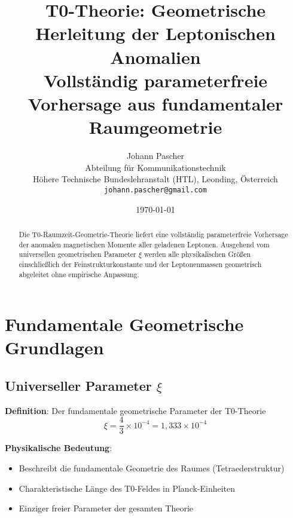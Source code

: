\documentclass[12pt,a4paper]{article}
\newcommand{\xipar}{\xi}
\begin{document}
	
	\title{T0-Theorie: Geometrische Herleitung der Leptonischen Anomalien \\
		\large Vollständig parameterfreie Vorhersage aus fundamentaler Raumgeometrie}
	\author{Johann Pascher\\
		Abteilung für Kommunikationstechnik\\
		Höhere Technische Bundeslehranstalt (HTL), Leonding, Österreich\\
		\texttt{johann.pascher@gmail.com}}
	\date{\today}
	
	\maketitle
	
	\begin{abstract}
		Die T0-Raumzeit-Geometrie-Theorie liefert eine vollständig parameterfreie Vorhersage der anomalen magnetischen Momente aller geladenen Leptonen. Ausgehend vom universellen geometrischen Parameter $\xipar$ werden alle physikalischen Größen einschließlich der Feinstrukturkonstante und der Leptonenmassen geometrisch abgeleitet ohne empirische Anpassung.
	\end{abstract}
	
	\tableofcontents
	\newpage
	
	\section{Fundamentale Geometrische Grundlagen}
	
	\subsection{Universeller Parameter $\xipar$}
	
	\textbf{Definition}: Der fundamentale geometrische Parameter der T0-Theorie
	\begin{equation}
		\xipar = \frac{4}{3} \times 10^{-4} = 1{,}333 \times 10^{-4}
	\end{equation}
	
	\textbf{Physikalische Bedeutung}:
	\begin{itemize}
		\item Beschreibt die fundamentale Geometrie des Raumes (Tetraederstruktur)
		\item Charakteristische Länge des T0-Feldes in Planck-Einheiten
		\item Einziger freier Parameter der gesamten Theorie
	\end{itemize}
	
\end{document}
